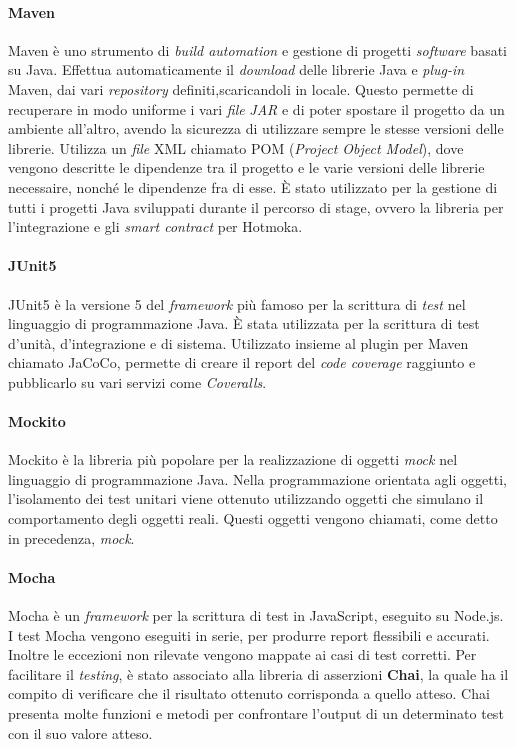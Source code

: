 \paragraph{Maven}
Maven è uno strumento di \textit{build automation} e gestione di progetti \textit{software} basati su Java. Effettua automaticamente il \textit{download} delle librerie Java e \textit{plug-in} Maven, dai vari \textit{repository} definiti,scaricandoli in locale. Questo permette di recuperare in modo uniforme i vari \textit{file} \textit{JAR} e di poter spostare il progetto da un ambiente all'altro, avendo la sicurezza di utilizzare sempre le stesse versioni delle librerie. Utilizza un \textit{file} XML chiamato POM (\textit{Project Object Model}), dove vengono descritte le dipendenze tra il progetto e le varie versioni delle librerie necessaire, nonché le dipendenze fra di esse. È stato utilizzato per la gestione di tutti i progetti Java sviluppati durante il percorso di stage, ovvero la libreria per l'integrazione e gli \textit{smart contract} per Hotmoka.

\paragraph{JUnit5}

JUnit5 è la versione 5 del \textit{framework} più famoso per la scrittura di \textit{test} nel linguaggio di programmazione Java. È stata utilizzata per la scrittura di test d'unità, d'integrazione e di sistema. Utilizzato insieme al plugin per Maven chiamato JaCoCo, permette di creare il report del \textit{code coverage} raggiunto e pubblicarlo su vari servizi come \textit{Coveralls}.

\paragraph{Mockito}
Mockito è la libreria più popolare per la realizzazione di oggetti \textit{mock} nel linguaggio di programmazione Java. Nella programmazione orientata agli oggetti, l'isolamento dei test unitari viene ottenuto utilizzando oggetti che simulano il comportamento degli oggetti reali. Questi oggetti vengono chiamati, come detto in precedenza, \textit{mock}.

\paragraph{Mocha}
Mocha è un \textit{framework} per la scrittura di test in JavaScript, eseguito su Node.js. I test Mocha vengono eseguiti in serie, per produrre report flessibili e accurati. Inoltre le eccezioni non rilevate vengono mappate ai casi di test corretti. Per facilitare il \textit{testing}, è stato associato alla libreria di asserzioni \textbf{Chai}, la quale ha il compito di verificare che il risultato ottenuto corrisponda a quello atteso. Chai presenta molte funzioni e metodi per confrontare l'output di un determinato test con il suo valore atteso.

